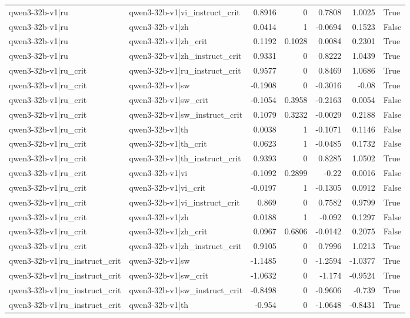 \begin{table}
\begin{tabular}{l l r r r r l}
qwen3-32b-v1|ru & qwen3-32b-v1|vi_instruct_crit & 0.8916 & 0 & 0.7808 & 1.0025 & True \\
qwen3-32b-v1|ru & qwen3-32b-v1|zh & 0.0414 & 1 & -0.0694 & 0.1523 & False \\
qwen3-32b-v1|ru & qwen3-32b-v1|zh_crit & 0.1192 & 0.1028 & 0.0084 & 0.2301 & True \\
qwen3-32b-v1|ru & qwen3-32b-v1|zh_instruct_crit & 0.9331 & 0 & 0.8222 & 1.0439 & True \\
qwen3-32b-v1|ru_crit & qwen3-32b-v1|ru_instruct_crit & 0.9577 & 0 & 0.8469 & 1.0686 & True \\
qwen3-32b-v1|ru_crit & qwen3-32b-v1|sw & -0.1908 & 0 & -0.3016 & -0.08 & True \\
qwen3-32b-v1|ru_crit & qwen3-32b-v1|sw_crit & -0.1054 & 0.3958 & -0.2163 & 0.0054 & False \\
qwen3-32b-v1|ru_crit & qwen3-32b-v1|sw_instruct_crit & 0.1079 & 0.3232 & -0.0029 & 0.2188 & False \\
qwen3-32b-v1|ru_crit & qwen3-32b-v1|th & 0.0038 & 1 & -0.1071 & 0.1146 & False \\
qwen3-32b-v1|ru_crit & qwen3-32b-v1|th_crit & 0.0623 & 1 & -0.0485 & 0.1732 & False \\
qwen3-32b-v1|ru_crit & qwen3-32b-v1|th_instruct_crit & 0.9393 & 0 & 0.8285 & 1.0502 & True \\
qwen3-32b-v1|ru_crit & qwen3-32b-v1|vi & -0.1092 & 0.2899 & -0.22 & 0.0016 & False \\
qwen3-32b-v1|ru_crit & qwen3-32b-v1|vi_crit & -0.0197 & 1 & -0.1305 & 0.0912 & False \\
qwen3-32b-v1|ru_crit & qwen3-32b-v1|vi_instruct_crit & 0.869 & 0 & 0.7582 & 0.9799 & True \\
qwen3-32b-v1|ru_crit & qwen3-32b-v1|zh & 0.0188 & 1 & -0.092 & 0.1297 & False \\
qwen3-32b-v1|ru_crit & qwen3-32b-v1|zh_crit & 0.0967 & 0.6806 & -0.0142 & 0.2075 & False \\
qwen3-32b-v1|ru_crit & qwen3-32b-v1|zh_instruct_crit & 0.9105 & 0 & 0.7996 & 1.0213 & True \\
qwen3-32b-v1|ru_instruct_crit & qwen3-32b-v1|sw & -1.1485 & 0 & -1.2594 & -1.0377 & True \\
qwen3-32b-v1|ru_instruct_crit & qwen3-32b-v1|sw_crit & -1.0632 & 0 & -1.174 & -0.9524 & True \\
qwen3-32b-v1|ru_instruct_crit & qwen3-32b-v1|sw_instruct_crit & -0.8498 & 0 & -0.9606 & -0.739 & True \\
qwen3-32b-v1|ru_instruct_crit & qwen3-32b-v1|th & -0.954 & 0 & -1.0648 & -0.8431 & True \\

\end{tabular}
\end{table}
